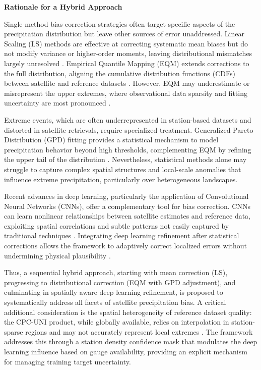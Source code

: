 \documentclass[remotesensing,article,submit,pdftex,moreauthors]{Definitions/mdpi}
\begin{document}
\textbf{Rationale for a Hybrid Approach}

Single-method bias correction strategies often target specific aspects
of the precipitation distribution but leave other sources of error
unaddressed. Linear Scaling (LS) methods are effective at correcting
systematic mean biases but do not modify variance or higher-order
moments, leaving distributional mismatches largely unresolved
\cite{ref4,ref16}. Empirical Quantile Mapping (EQM) extends corrections to the
full distribution, aligning the cumulative distribution functions (CDFs)
between satellite and reference datasets \cite{ref5,ref6}. However, EQM may
underestimate or misrepresent the upper extremes, where observational
data sparsity and fitting uncertainty are most pronounced \cite{ref8}.

Extreme events, which are often underrepresented in station-based
datasets and distorted in satellite retrievals, require specialized
treatment. Generalized Pareto Distribution (GPD) fitting provides a
statistical mechanism to model precipitation behavior beyond high
thresholds, complementing EQM by refining the upper tail of the
distribution \cite{ref7}. Nevertheless, statistical methods alone may
struggle to capture complex spatial structures and local-scale anomalies
that influence extreme precipitation, particularly over heterogeneous
landscapes.

Recent advances in deep learning, particularly the application of
Convolutional Neural Networks (CNNs), offer a complementary tool for
bias correction. CNNs can learn nonlinear relationships between
satellite estimates and reference data, exploiting spatial correlations
and subtle patterns not easily captured by traditional techniques
\cite{ref9,ref17}. Integrating deep learning refinement after statistical
corrections allows the framework to adaptively correct localized errors
without undermining physical plausibility \cite{ref10}.

Thus, a sequential hybrid approach, starting with mean correction (LS),
progressing to distributional correction (EQM with GPD adjustment), and
culminating in spatially aware deep learning refinement, is proposed to
systematically address all facets of satellite precipitation bias. A
critical additional consideration is the spatial heterogeneity of
reference dataset quality: the CPC-UNI product, while globally
available, relies on interpolation in station-sparse regions and may not
accurately represent local extremes \cite{ref13,ref18}. The framework addresses
this through a station density confidence mask that modulates the deep
learning influence based on gauge availability, providing an explicit
mechanism for managing training target uncertainty.
\end{document}
